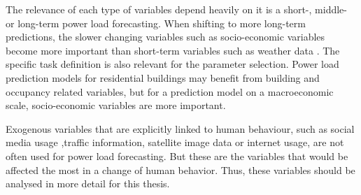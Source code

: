 The relevance of each type of variables depend heavily on it is
a short-, middle- or long-term power load forecasting. When shifting to more 
long-term predictions, the slower changing variables such as socio-economic
variables become more important than short-term variables such as weather data 
\cite{loadforecastingtimedependency2}\cite{loadforecastingtimedependency}.
The specific task definition is also relevant for the parameter selection.
Power load prediction models for residential buildings may benefit from 
building and occupancy related variables, but for a prediction model on a 
macroeconomic scale, socio-economic variables are more important.

Exogenous variables that are explicitly linked to human behaviour, 
such as social media usage ,traffic information,  
satellite image data or internet usage, are not often 
used for power load forecasting. 
But these are the variables that would be affected the most in a change of 
human behavior. Thus, these variables should be analysed in more detail 
for this thesis.

